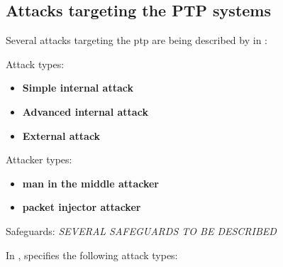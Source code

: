 \subsection{Attacks targeting the PTP systems}


Several attacks targeting the \acrlong{ptp} are being described by \citeauthor{alghamdi2021precision} in \cite{alghamdi2021precision}:









Attack types:
\begin{itemize}
    \item \textbf{Simple internal attack}  
    \item \textbf{Advanced internal attack}
    \item \textbf{External attack} 
\end{itemize}

Attacker types:
\begin{itemize}
    \item \textbf{man in the middle attacker}  
    \item \textbf{packet injector attacker}
\end{itemize}


Safeguards: \textit{SEVERAL SAFEGUARDS TO BE DESCRIBED}




In \cite{alghamdi2021precision}, \citeauthor{alghamdi2021precision} specifies the following attack types:

